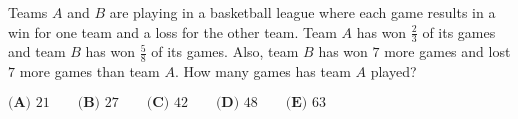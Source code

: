 Teams $A$ and $B$ are playing in a basketball league where each game results in a win for one team and a loss for the other team. Team $A$ has won $\tfrac{2}{3}$ of its games and team $B$ has won $\tfrac{5}{8}$ of its games. Also, team $B$ has won $7$ more games and lost $7$ more games than team $A.$ How many games has team $A$ played?

$\textbf{(A) } 21 \qquad \textbf{(B) } 27 \qquad \textbf{(C) } 42 \qquad \textbf{(D) } 48 \qquad \textbf{(E) } 63$
